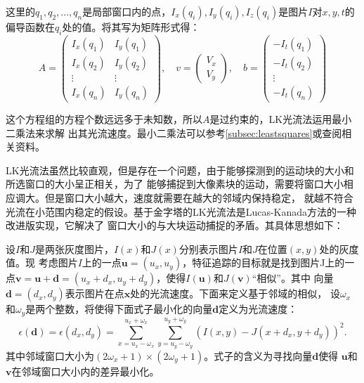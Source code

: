 这里的$q_1,q_2,...,q_n$是局部窗口内的点，$I_x(q_i),I_y(q_i),I_z(q_i)$是图片$I$对$x,y,t$的
偏导函数在$q_i$处的值。将其写为矩阵形式得：\\
\begin{equation}
	A=	
	\left(
	\begin{array}{cc}
		I_x(q_1) & I_y(q_1)\\
		I_x(q_2) & I_y(q_2)\\
		  \vdots & \vdots\\
		I_x(q_n) & I_y(q_n)
		\end{array}
	\right),\quad
	v=
	\left(
	\begin{array}{c}
		V_x\\
		V_y
	\end{array}
	\right),\quad
	b=
	\left(
	\begin{array}{c}
		-I_t(q_1)\\
		-I_t(q_2)\\
		\vdots\\
		-I_t(q_n)
	\end{array}
	\right)
\end{equation}

这个方程组的方程个数远远多于未知数，所以$A$是过约束的，LK光流法运用最小二乘法来求解
出其光流速度。最小二乘法可以参考\ref{subsec:leastsquares}或查阅相关资料。

LK光流法虽然比较直观，但是存在一个问题，由于能够探测到的运动块的大小和所选窗口的大小呈正相关，为了
能够捕捉到大像素块的运动，需要将窗口大小相应调大。但是窗口大小越大，速度就需要在越大的邻域内保持稳定，
就越不符合光流在小范围内稳定的假设。基于金字塔的LK光流法是Lucas-Kanada方法的一种改进版实现，它解决了
窗口大小的与大块运动捕捉的矛盾。其具体思想如下：

设$I$和$J$是两张灰度图片，$I(x)$和$J(x)$分别表示图片$I$和$J$在位置$(x,y)$处的灰度值。现
考虑图片$I$上的一点$\mathbf{u}=(u_x, u_y)$，特征追踪的目标就是找到图片J上的一点$\mathbf{v}
=\mathbf{u}+\mathbf{d}=(u_x+d_x,u_y+d_y)$，使得$I(\mathbf{u})$和$J(\mathbf{v})$“相似”。其中
向量$\mathbf{d}=(d_x,d_y)$表示图片在点$\mathbf{x}$处的光流速度。下面来定义基于邻域的相似，
设$\omega_x$和$\omega_y$是两个整数，将使得下面式子最小化的向量$\mathbf{d}$定义为光流速度：\\
\begin{equation}\label{eq:similarity}
	\epsilon(\mathbf{d})=\epsilon(d_x,d_y)=\sum_{x=u_x-\omega_x}^{u_x+\omega_x}\sum_{y=u_y-\omega_y}
	^{u_y+\omega_y}(I(x,y) - J(x+d_x,y+d_y))^2.
\end{equation}
其中邻域窗口大小为$(2\omega_x+1)\times(2\omega_y+1)$。式子的含义为寻找向量$\mathbf{d}$使得
$\mathbf{u}$和$\mathbf{v}$在邻域窗口大小内的差异最小化。

